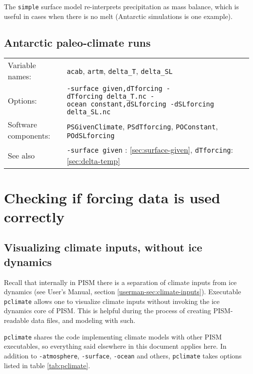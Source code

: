 \documentclass[titlepage,letterpaper,final]{scrartcl}
\def\optsection#1{%
  \def\optindex##1{\index[options]{#1!##1}}
  \def\optseealso##1{\index[options]{#1|see{##1}}}
}
\begin{document}
The \texttt{simple} surface model  re-interprets precipitation as mass balance,
which is  useful in cases when there  is no melt (Antarctic  simulations is one
example).

\subsection{Antarctic paleo-climate runs}
\label{sec:use-case-antarctica-paleo}

\begin{center}
  \begin{tabular}{lp{}}
    \toprule
    Variable names: & \texttt{acab}, \texttt{artm}, \texttt{delta_T}, \texttt{delta_SL}\\
    Options: & \texttt{-surface given,dTforcing \mbox{-dTforcing delta_T.nc}
      \mbox{-ocean constant,dSLforcing} -dSLforcing delta_SL.nc} \\
    Software   components:  &   \texttt{PSGivenClimate},  \texttt{PSdTforcing},
    \texttt{POConstant}, \texttt{POdSLforcing}\\
    See   also    &   \texttt{-surface   given}    :   \ref{sec:surface-given},
    \texttt{dTforcing}: \ref{sec:delta-temp}\\
    \bottomrule
  \end{tabular}
\end{center}

\section{Checking if forcing data is used correctly}
\label{sec:checking-forcing}


\subsection{Visualizing climate inputs, without ice dynamics}
\label{sec:pclimate}
\optsection{\texttt{pclimate} options}

Recall that internally in PISM there is a separation of climate inputs from ice
dynamics (see User's Manual, section \ref*{userman-sec:climate-inputs}). Executable
\texttt{pclimate}  allows one to visualize climate inputs without
invoking the ice dynamics core of PISM. This is helpful during the process of
creating PISM-readable data files, and modeling with such.

\texttt{pclimate} shares the code implementing climate models with other PISM
executables, so everything said elsewhere in this document  applies
here. In addition to \texttt{-atmosphere}, \texttt{-surface}, \texttt{-ocean}
and others, \texttt{pclimate} takes options listed in table \ref{tab:pclimate}.
\end{document}
